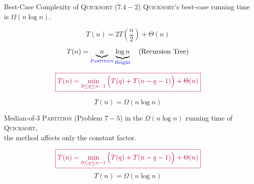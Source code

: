 
\begin{frame}{}
\end{frame}

\begin{frame}{}
  \begin{exampleblock}{Best-Case Complexity of \textsc{Quicksort} ($7.4-2$)}
     \textsc{Quicksort}'s best-case running time is $\Omega(n \log n)$.
  \end{exampleblock}

  \pause
  \[
    T(n) = 2T(\frac{n}{2}) + \Theta(n)
  \]

  \pause
  \[
    T(n) = \underbrace{n}_{\textsc{\textcolor{blue}{Partition}}} \underbrace{\log n}_{\text{\textcolor{blue}{Height}}} \quad \text{(Recursion Tree)}
  \]

  \pause
  \vspace{0.30cm}
  \[
    \textcolor{purple}{\boxed{T(n) = \min_{0 \le q \le n-1} \Big( T(q) + T(n-q-1) \Big) + \Theta(n)}}
  \]

  \pause
  \[
    T(n) = \Omega(n \log n)
  \]

  \pause
  \centerline{}
\end{frame}

\begin{frame}{}
  \begin{exampleblock}{Median-of-3 \textsc{Partition} (Problem $7-5$)}
     in the $\Omega(n \log n)$ running time of \textsc{Quicksort}, \\
    the  method affects only the constant factor.
  \end{exampleblock}

  \pause

  \pause
  \[
    \textcolor{purple}{\boxed{T(n) = \min_{0 \le q \le n-1} \Big( T(q) + T(n-q-1) \Big) + \Theta(n)}}
  \]
  \[
    T(n) = \Omega(n \log n)
  \]
\end{frame}

\begin{frame}{}
\end{frame}

\begin{frame}{}
\end{frame}

